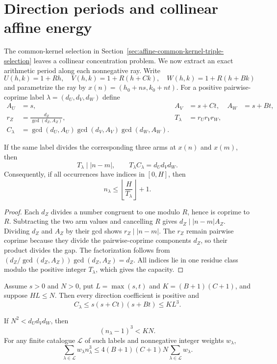 \section{Direction periods and collinear affine energy}
\label{sec:affine-collinear-period-energy}

The common-kernel selection in
Section~\ref{sec:affine-common-kernel-triple-selection} leaves a collinear
concentration problem.  We now extract an exact arithmetic period along each
nonnegative ray.  Write
\[
 U(h,k)=1+Rh,\quad V(h,k)=1+R(h+Ck),
 \quad W(h,k)=1+R(h+Bk)
\]
and parametrize the ray by
$x(n)=(h_0+ns,k_0+nt)$.  For a positive pairwise-coprime label
$\lambda=(d_U,d_V,d_W)$ define
\begin{align*}
 A_U&=s,&A_V&=s+Ct,&A_W&=s+Bt,\\
 r_Z&=\frac{d_Z}{\gcd(d_Z,A_Z)},&
 T_\lambda&=r_Ur_Vr_W,\\
 C_\lambda&=\gcd(d_U,A_U)\gcd(d_V,A_V)\gcd(d_W,A_W).
\end{align*}

\begin{theorem}
\label{thm:affine-exact-ray-period}
If the same label divides the corresponding three arms at $x(n)$ and
$x(m)$, then
\[
 T_\lambda\mid |n-m|,\qquad
 T_\lambda C_\lambda=d_Ud_Vd_W.
\]
Consequently, if all occurrences have indices in $[0,H]$, then
\[
       n_\lambda\le\left\lfloor\frac{H}{T_\lambda}\right\rfloor+1.
\]
\end{theorem}

\begin{proof}
Each $d_Z$ divides a number congruent to one modulo $R$, hence is coprime to
$R$.  Subtracting the two arm values and cancelling $R$ gives
$d_Z\mid |n-m|A_Z$.  Dividing $d_Z$ and $A_Z$ by their gcd shows
$r_Z\mid|n-m|$.  The $r_Z$ remain pairwise coprime because they divide the
pairwise-coprime components $d_Z$, so their product divides the gap.  The
factorization follows from
$(d_Z/\gcd(d_Z,A_Z))\gcd(d_Z,A_Z)=d_Z$.  All indices lie in one residue
class modulo the positive integer $T_\lambda$, which gives the capacity.
\end{proof}

Assume $s>0$ and $N>0$, put $L=\max(s,t)$ and $K=(B+1)(C+1)$, and suppose
$HL\le N$.
Then every direction coefficient is positive and
\[
 C_\lambda\le s(s+Ct)(s+Bt)\le KL^3.
\]

\begin{theorem}
\label{thm:affine-ray-cube-root-cap}
If $N^2<d_Ud_Vd_W$, then
\[
                         (n_\lambda-1)^3<KN.
\]
For any finite catalogue $\mathcal L$ of such labels and nonnegative integer
weights $w_\lambda$,
\[
 \sum_{\lambda\in\mathcal L}w_\lambda n_\lambda^3
 \le4(B+1)(C+1)N\sum_{\lambda\in\mathcal L}w_\lambda.
\]
\end{theorem}

